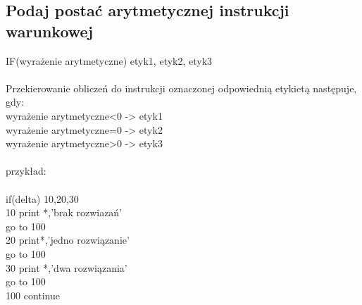\subsection{Podaj postać arytmetycznej instrukcji warunkowej}
IF(wyrażenie arytmetyczne) etyk1, etyk2, etyk3
\\
\\
Przekierowanie obliczeń do instrukcji oznaczonej odpowiednią etykietą następuje, gdy:
\\
wyrażenie arytmetyczne<0 -> etyk1
\\
wyrażenie arytmetyczne=0 -> etyk2
\\
wyrażenie arytmetyczne>0 -> etyk3
\\
\\
przykład:
\\
\\
if(delta) 10,20,30
\\
10 print *,'brak rozwiazań'
\\
	go to 100
\\
20 print*,'jedno rozwiązanie'
\\
	go to 100
\\
30 print *,'dwa rozwiązania'
\\
	go to 100
\\
100 continue